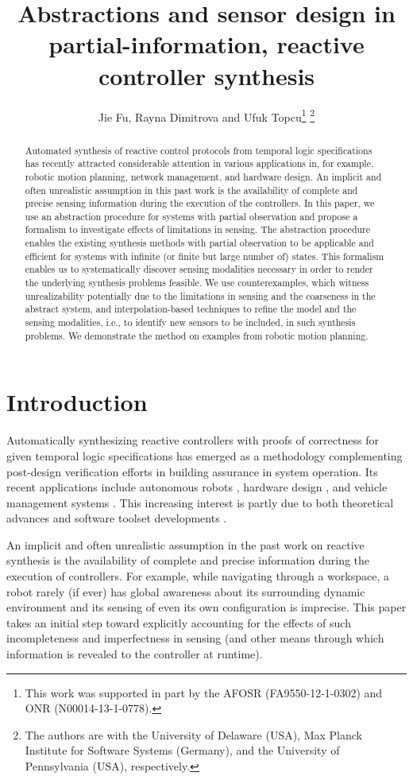 \documentclass[letterpaper, 10 pt, conference]{ieeeconf}
\title{Abstractions and sensor design in partial-information, reactive
controller synthesis}
\author{Jie Fu, Rayna Dimitrova and Ufuk Topcu\thanks{This work was supported in part by the AFOSR (FA9550-12-1-0302) and ONR (N00014-13-1-0778).}
\thanks{The authors are with the University of Delaware (USA), Max
  Planck Institute for Software Systems (Germany), and the University
  of Pennsylvania (USA), respectively.}}
\begin{document}
\maketitle
\thispagestyle{empty}
\pagestyle{empty}


\begin{abstract}
  Automated synthesis of reactive control protocols from temporal
  logic specifications has recently attracted considerable attention
  in various applications in, for example, robotic motion planning,
  network management, and hardware design. An implicit and often
  unrealistic assumption in this past work is the availability of
  complete and precise sensing information during the execution of the
  controllers. In this paper, we use an abstraction procedure for
  systems with partial observation and propose a formalism to
  investigate effects of limitations in sensing. The abstraction
  procedure enables the existing synthesis methods with partial
  observation to be applicable and efficient for systems with infinite
  (or finite but large number of) states. This formalism enables us to
  systematically discover sensing modalities necessary in order to
  render the underlying synthesis problems feasible. 
  We use counterexamples, which witness unrealizability potentially
  due to the limitations in sensing and the coarseness in the abstract
  system, and interpolation-based techniques to refine the model and
  the sensing modalities, i.e., to identify new sensors to be
  included, in such synthesis problems. We demonstrate the method on
  examples from robotic motion planning.
\end{abstract}


\section{Introduction}
\label{sec:intro}

Automatically synthesizing reactive controllers with proofs of
correctness for given temporal logic specifications has
emerged as a methodology complementing post-design verification
efforts in building assurance in system operation. Its recent
applications include autonomous robots \cite{ram-hadas,itac}, hardware
design \cite{GR(1)case}, and vehicle management systems
\cite{vms0}. This increasing interest is partly due to both
theoretical advances \cite{pnueli-hardmis, piterman} and software
toolset developments
\cite{pnueli2010jtlv,bloem2010ratsy,wongpiromsarn2011tulip}.

An implicit and often unrealistic assumption in the past work on
reactive synthesis is the availability of complete and precise 
information during the execution of controllers. For example,
while navigating through a workspace, a robot rarely (if ever) has
global awareness about its surrounding dynamic environment and its
sensing of even its own configuration is imprecise. This paper takes
an initial step toward explicitly accounting for the effects of such
incompleteness and imperfectness in sensing (and other means through
which information is revealed to the controller at runtime). 
\end{document}
